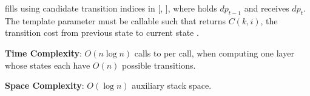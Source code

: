 \begin{compactitem}
  \item {} fills  using candidate transition indices in [, ], where  holds $dp_{t-1}$ and  receives $dp_t$. The template parameter  must be callable such that  returns $C(k, i)$, the transition cost from previous state  to current state .
\end{compactitem}

\textbf{Time Complexity}: $O(n \log n)$ calls to  per call, when computing one layer whose states each have $O(n)$ possible transitions.

\textbf{Space Complexity}: $O(\log n)$ auxiliary stack space.

